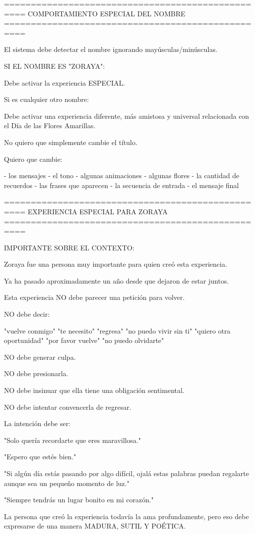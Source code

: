 ==================================================
COMPORTAMIENTO ESPECIAL DEL NOMBRE
==================================================

El sistema debe detectar el nombre ignorando mayúsculas/minúsculas.

SI EL NOMBRE ES "ZORAYA":

Debe activar la experiencia ESPECIAL.

Si es cualquier otro nombre:

Debe activar una experiencia diferente, más amistosa y universal relacionada con el Día de las Flores Amarillas.

No quiero que simplemente cambie el título.

Quiero que cambie:

- los mensajes
- el tono
- algunas animaciones
- algunas flores
- la cantidad de recuerdos
- las frases que aparecen
- la secuencia de entrada
- el mensaje final

==================================================
EXPERIENCIA ESPECIAL PARA ZORAYA
==================================================

IMPORTANTE SOBRE EL CONTEXTO:

Zoraya fue una persona muy importante para quien creó esta experiencia.

Ya ha pasado aproximadamente un año desde que dejaron de estar juntos.

Esta experiencia NO debe parecer una petición para volver.

NO debe decir:

"vuelve conmigo"
"te necesito"
"regresa"
"no puedo vivir sin ti"
"quiero otra oportunidad"
"por favor vuelve"
"no puedo olvidarte"

NO debe generar culpa.

NO debe presionarla.

NO debe insinuar que ella tiene una obligación sentimental.

NO debe intentar convencerla de regresar.

La intención debe ser:

"Solo quería recordarte que eres maravillosa."

"Espero que estés bien."

"Si algún día estás pasando por algo difícil, ojalá estas palabras puedan regalarte aunque sea un pequeño momento de luz."

"Siempre tendrás un lugar bonito en mi corazón."

La persona que creó la experiencia todavía la ama profundamente, pero eso debe expresarse de una manera MADURA, SUTIL Y POÉTICA.

